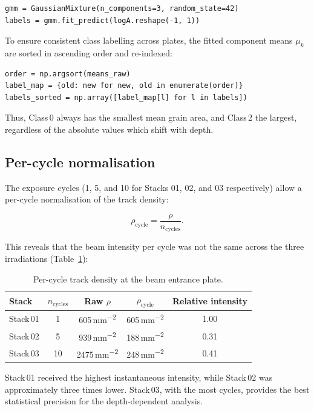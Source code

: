 \documentclass[12pt,a4paper]{article}
\begin{document}
\begin{verbatim}
gmm = GaussianMixture(n_components=3, random_state=42)
labels = gmm.fit_predict(logA.reshape(-1, 1))
\end{verbatim}

To ensure consistent class labelling across plates, the fitted
component means $\mu_k$ are sorted in ascending order and re-indexed:

\begin{verbatim}
order = np.argsort(means_raw)
label_map = {old: new for new, old in enumerate(order)}
labels_sorted = np.array([label_map[l] for l in labels])
\end{verbatim}

Thus, Class\,0 always has the smallest mean grain area, and Class\,2
the largest, regardless of the absolute values which shift with depth.

\subsection{Per-cycle normalisation}

The exposure cycles (1, 5, and 10 for Stacks 01, 02, and 03
respectively) allow a per-cycle normalisation of the track density:

\[
\rho_{\text{cycle}} = \frac{\rho}{n_{\text{cycles}}}.
\]

This reveals that the beam intensity per cycle was not the same across
the three irradiations (Table~\ref{tab:cycle}):

\begin{table}[H]
\centering
\caption{Per-cycle track density at the beam entrance plate.}
\label{tab:cycle}
\begin{tabular}{lcccc}
\toprule
Stack & $n_{\text{cycles}}$ & Raw $\rho$ & $\rho_{\text{cycle}}$ &
Relative intensity \\
\midrule
Stack\,01 & 1  & 605\,\si{\mm^{-2}} & 605\,\si{\mm^{-2}} & 1.00 \\
Stack\,02 & 5  & 939\,\si{\mm^{-2}} & 188\,\si{\mm^{-2}} & 0.31 \\
Stack\,03 & 10 & 2475\,\si{\mm^{-2}} & 248\,\si{\mm^{-2}} & 0.41 \\
\bottomrule
\end{tabular}
\end{table}

Stack\,01 received the highest instantaneous intensity, while
Stack\,02 was approximately three times lower. Stack\,03, with the
most cycles, provides the best statistical precision for the
depth-dependent analysis.
\end{document}
